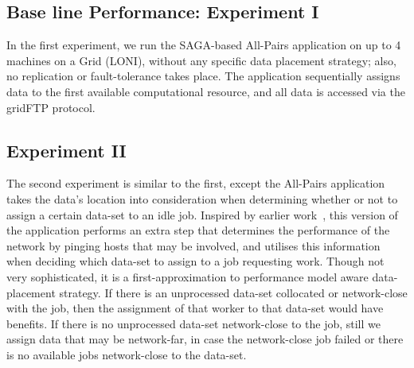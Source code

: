 \documentclass{rspublic}
\begin{document}
\subsection{Base line Performance: Experiment I} In the first experiment, we run the
SAGA-based All-Pairs application on up to 4 machines on a Grid (LONI),
without any specific data placement strategy; also, no replication or
fault-tolerance takes place.  The application sequentially assigns
data to the first available computational resource, and all data is
accessed via the gridFTP protocol.


\subsection{Experiment II} The second experiment is similar to the
first, except the All-Pairs application takes the data's location into
consideration when determining whether or not to assign a certain
data-set to an idle job.  Inspired by earlier work~\citep{netperf}, this
version of the application performs an extra step that determines the
performance of the network by pinging hosts that may be involved, and
utilises this information when deciding which data-set to assign to a
job requesting work.  Though not very sophisticated, it is a
first-approximation to performance model aware data-placement
strategy.
If there is an unprocessed data-set collocated or network-close with the
job, then the assignment of that worker to that data-set would have
benefits.  If there is no unprocessed data-set network-close to the job,
still we assign data that may be network-far, in case the network-close
job failed or there is no available jobs network-close to the
data-set.

\end{document}
